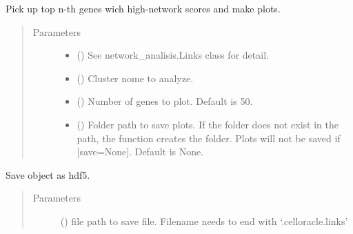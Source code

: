 \documentclass[letterpaper,10pt,english]{sphinxmanual}
\begin{document}
\begin{fulllineitems}
\begin{fulllineitems}
\label{\detokenize{modules/celloracle:celloracle.Links.plot_scores_as_rank}}
Pick up top n-th genes wich high-network scores and make plots.
\begin{quote}\begin{description}
\item[{Parameters}] \leavevmode\begin{itemize}
\item {} 
 ({\hyperref[\detokenize{modules/celloracle:celloracle.Links}]{}}) \textendash{} See network\_analisis.Links class for detail.

\item {} 
 () \textendash{} Cluster nome to analyze.

\item {} 
 () \textendash{} Number of genes to plot. Default is 50.

\item {} 
 () \textendash{} Folder path to save plots. If the folder does not exist in the path, the function creates the folder.
Plots will not be saved if {[}save=None{]}. Default is None.

\end{itemize}

\end{description}\end{quote}

\end{fulllineitems}


\begin{fulllineitems}
\label{\detokenize{modules/celloracle:celloracle.Links.to_hdf5}}
Save object as hdf5.
\begin{quote}\begin{description}
\item[{Parameters}] \leavevmode
{} () \textendash{} file path to save file. Filename needs to end with ‘.celloracle.links’

\end{description}\end{quote}

\end{fulllineitems}


\end{fulllineitems}
\end{document}
